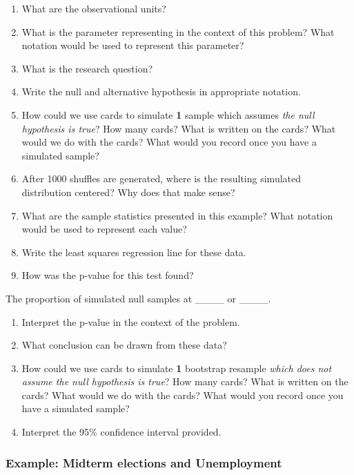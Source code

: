 \documentclass[
]{report}
\newcommand{\rgs}{\vspace{12pt}} %
\begin{document}
\begin{enumerate}
\def\labelenumi{\arabic{enumi}.}
\item
  What are the observational units?
  \rgs
\item
  What is the parameter representing in the context of this problem? What notation would be used to represent this parameter?
  \rgs
  \rgs
\item
  What is the research question?
  \rgs
\item
  Write the null and alternative hypothesis in appropriate notation.
  \rgs
\item
  How could we use cards to simulate \textbf{1} sample which assumes \emph{the null hypothesis is true}? How many cards? What is written on the cards? What would we do with the cards? What would you record once you have a simulated sample?
  \rgs
  \rgs
\item
  After 1000 shuffles are generated, where is the resulting simulated distribution centered? Why does that make sense?
  \rgs
  \rgs
\item
  What are the sample statistics presented in this example? What notation would be used to represent each value?
  \rgs
\item
  Write the least squares regression line for these data.
  \rgs
\item
  How was the p-value for this test found?
\end{enumerate}

The proportion of simulated null samples at \_\_\_\_ or \_\_\_\_.
\rgs

\begin{enumerate}
\def\labelenumi{\arabic{enumi}.}
\setcounter{enumi}{9}
\item
  Interpret the p-value in the context of the problem.
  \rgs
  \rgs
\item
  What conclusion can be drawn from these data?\\
  \rgs
\item
  How could we use cards to simulate \textbf{1} bootstrap resample \emph{which does not assume the null hypothesis is true}? How many cards? What is written on the cards? What would we do with the cards? What would you record once you have a simulated sample?
  \rgs
  \rgs
\item
  Interpret the 95\% confidence interval provided.
  \rgs
  \rgs
\end{enumerate}

\hypertarget{example-midterm-elections-and-unemployment}{%
\subsubsection*{Example: Midterm elections and Unemployment}\label{example-midterm-elections-and-unemployment}}
\end{document}
